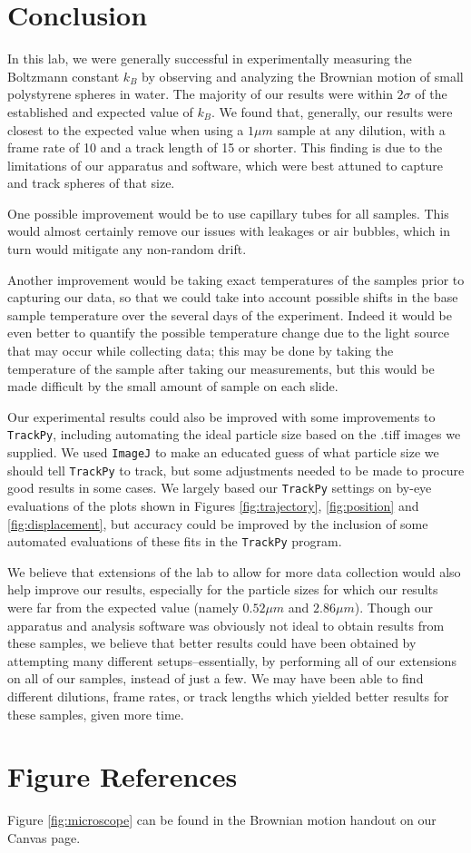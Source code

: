 \documentclass[twocolumn,amsmath,amssymb,pra, floatfix]{revtex4-2}
\begin{document}
\section{Conclusion}

In this lab, we were generally successful in experimentally measuring the Boltzmann constant $k_B$ by observing and analyzing the Brownian motion of small polystyrene spheres in water. The majority of our results were within $2\sigma$ of the established and expected value of $k_B$. We found that, generally, our results were closest to the expected value when using a $1 \si{\mu m}$ sample at any dilution, with a frame rate of 10 and a track length of 15 or shorter. This finding is due to the limitations of our apparatus and software, which were best attuned to capture and track spheres of that size.    

One possible improvement would be to use capillary tubes for all samples. This would almost certainly remove our issues with leakages or air bubbles, which in turn would mitigate any non-random drift.

Another improvement would be taking exact temperatures of the samples prior to capturing our data, so that we could take into account possible shifts in the base sample temperature over the several days of the experiment. Indeed it would be even better to quantify the possible temperature change due to the light source that may occur while collecting data; this may be done by taking the temperature of the sample after taking our measurements, but this would be made difficult by the small amount of sample on each slide.

Our experimental results could also be improved with some improvements to \texttt{TrackPy}, including automating the ideal particle size based on the .tiff images we supplied. We used \texttt{ImageJ} to make an educated guess of what particle size we should tell \texttt{TrackPy} to track, but some adjustments needed to be made to procure good results in some cases. We largely based our \texttt{TrackPy} settings on by-eye evaluations of the plots shown in Figures \ref{fig:trajectory}, \ref{fig:position} and \ref{fig:displacement}, but accuracy could be improved by the inclusion of some automated evaluations of these fits in the \texttt{TrackPy} program. 

We believe that extensions of the lab to allow for more data collection would also help improve our results, especially for the particle sizes for which our results were far from the expected value (namely $0.52 \si{\mu m}$ and $2.86 \si{\mu m}$). Though our apparatus and analysis software was obviously not ideal to obtain results from these samples, we believe that better results could have been obtained by attempting many different setups--essentially, by performing all of our extensions on all of our samples, instead of just a few. We may have been able to find different dilutions, frame rates, or track lengths which yielded better results for these samples, given more time. 

\section{Figure References}
Figure \ref{fig:microscope} can be found in the Brownian motion handout on our Canvas page.



\end{document}
